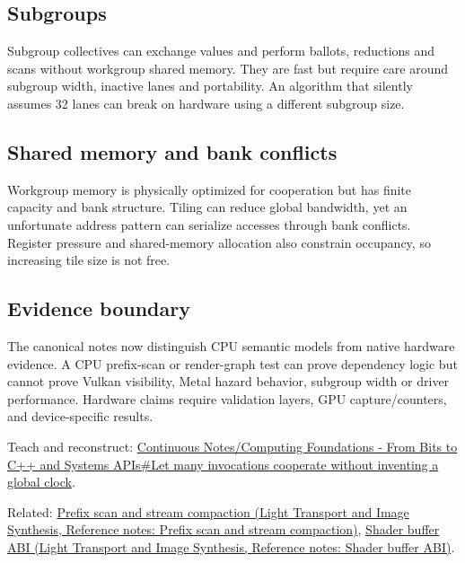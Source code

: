 \subsection{Subgroups}\label{appendix-f662b5b1773b-subgroups}

\hypertarget{appendix-f662b5b1773b-subgroups}{}

Subgroup collectives can exchange values and perform ballots, reductions and scans without workgroup shared memory. They are fast but require care around subgroup width, inactive lanes and portability. An algorithm that silently assumes 32 lanes can break on hardware using a different subgroup size.

\subsection{Shared memory and bank conflicts}\label{appendix-f662b5b1773b-shared-memory-and-bank-conflicts}

\hypertarget{appendix-f662b5b1773b-shared-memory-and-bank-conflicts}{}

Workgroup memory is physically optimized for cooperation but has finite capacity and bank structure. Tiling can reduce global bandwidth, yet an unfortunate address pattern can serialize accesses through bank conflicts. Register pressure and shared-memory allocation also constrain occupancy, so increasing tile size is not free.

\subsection{Evidence boundary}\label{appendix-f662b5b1773b-evidence-boundary}

\hypertarget{appendix-f662b5b1773b-evidence-boundary}{}

The canonical notes now distinguish CPU semantic models from native hardware evidence. A CPU prefix-scan or render-graph test can prove dependency logic but cannot prove Vulkan visibility, Metal hazard behavior, subgroup width or driver performance. Hardware claims require validation layers, GPU capture/counters, and device-specific results.

Teach and reconstruct: \hyperref[01-foundations-i-ch008-let-many-invocations-cooperate-without-inventing-a-global-clock]{Continuous Notes/Computing Foundations - From Bits to C++ and Systems APIs\#Let many invocations cooperate without inventing a global clock}.

Related: \href{../04-Light-Transport-and-Image-Synthesis/main.pdf\#nameddest=appendix-f2ee4d086415}{Prefix scan and stream compaction (Light Transport and Image Synthesis, Reference notes: Prefix scan and stream compaction)}, \href{../04-Light-Transport-and-Image-Synthesis/main.pdf\#nameddest=appendix-749048795dbb}{Shader buffer ABI (Light Transport and Image Synthesis, Reference notes: Shader buffer ABI)}.
